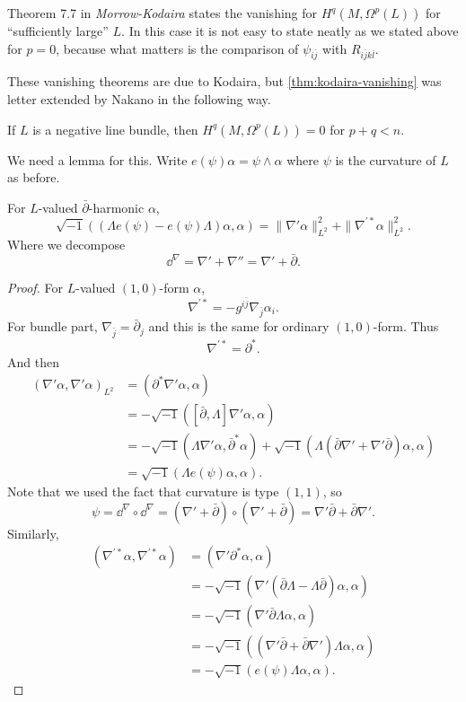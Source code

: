 \documentclass[12pt]{article}
\begin{document}
Theorem 7.7 in \emph{Morrow-Kodaira} states the vanishing for \(H^q(M,
\Omega^p(L))\) for ``sufficiently large'' \(L\). In this case it is not easy
to state neatly as we stated above for \(p=0\), because what matters is the
comparison of \(\psi_{i\bar{j}}\) with \(R_{i\bar{j}k\bar{l}}\).

These vanishing theorems are due to Kodaira, but \cref{thm:kodaira-vanishing}
was letter extended by Nakano in the following way.

\begin{theorem}\label{thm:nakano-vanishing}
  If \(L\) is a negative line bundle, then \(H^q(M,\Omega^p(L))=0\) for \(p+q
  <n\).
\end{theorem}
We need a lemma for this. Write \(e(\psi)\alpha=\psi\wedge\alpha\) where \(\psi\)
is the curvature of \(L\) as before.
\begin{lemma}
  For \(L\)-valued \(\bar{\partial}\)-harmonic \(\alpha\), \[
    \sqrt{-1}((\Lambda e(\psi)-e(\psi)\Lambda)\alpha,\alpha)
    =\|\nabla'\alpha\|_{L^2}^2+\|\nabla^{\prime*}\alpha\|_{L^2}^2
  .\] Where we decompose \[
    \dd^\nabla =\nabla'+\nabla''=\nabla'+\bar{\partial}
  .\] 
\end{lemma}
\begin{proof}
  For \(L\)-valued \((1,0)\)-form \(\alpha\), \[
    \nabla^{\prime*}=-g^{i\bar{j}}\nabla_{\bar{j}}\alpha_i
  .\] For bundle part, \(\nabla_{\bar{j}}=\bar{\partial}_j\) and this is the 
  same for ordinary \((1,0)\)-form. Thus \[
    \nabla^{\prime*}=\partial^*
  .\] And then
  \begin{align*}
    (\nabla'\alpha,\nabla'\alpha)_{L^2}&=(\partial^*\nabla'\alpha,\alpha) \\
    &=-\sqrt{-1}([\bar{\partial},\Lambda]\nabla'\alpha,\alpha) \\
    &=-\sqrt{-1}(\Lambda \nabla'\alpha,\bar{\partial}^*\alpha)+\sqrt{-1}
    (\Lambda(\bar{\partial}\nabla'+\nabla'\bar{\partial})\alpha,\alpha) \\
    &=\sqrt{-1}(\Lambda e(\psi)\alpha,\alpha)
  .\end{align*}
  Note that we used the fact that curvature is type \((1,1)\), so \[
    \psi=\dd^\nabla\circ \dd^\nabla =(\nabla'+\bar{\partial})\circ 
    (\nabla'+\bar{\partial})=\nabla'\bar{\partial}+\bar{\partial}\nabla'
  .\] Similarly,
  \begin{align*}
    (\nabla^{\prime*}\alpha,\nabla^{\prime*}\alpha)&=(\nabla'\partial^*\alpha,
    \alpha) \\
    &=-\sqrt{-1}(\nabla'(\bar{\partial}\Lambda-\Lambda\bar{\partial})\alpha,
    \alpha) \\
    &=-\sqrt{-1}(\nabla'\bar{\partial}\Lambda \alpha,\alpha) \\
    &=-\sqrt{-1}((\nabla'\bar{\partial}+\bar{\partial}\nabla')\Lambda\alpha,
    \alpha) \\
    &=-\sqrt{-1}(e(\psi)\Lambda\alpha,\alpha)
  .\end{align*}
\end{proof}
\end{document}
